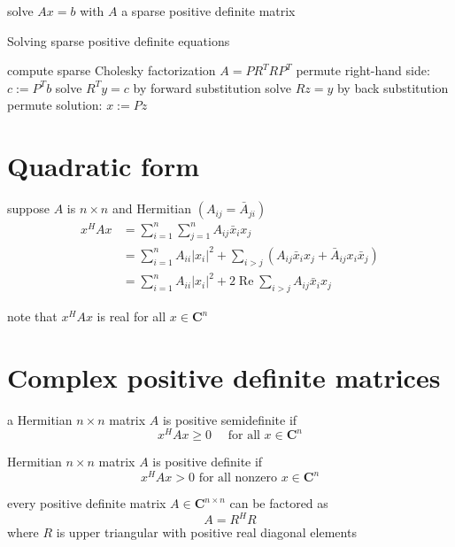 solve $ A x=b $ with $ A $ a sparse positive definite matrix

\begin{algorithm}
    \caption{Solving sparse positive definite equations}
    compute sparse Cholesky factorization $ A=P R^{T} R P^{T} $\;
    permute right-hand side: $ c:=P^{T} b $\;
    solve $ R^{T} y=c $ by forward substitution\;
    solve $ R z=y $ by back substitution\;
    permute solution: $ x:=P z $\;
\end{algorithm}

\section{Quadratic form}

\begin{theorem}
    suppose $A$ is $n \times n$ and Hermitian $\left(A_{i j}=\bar{A}_{j i}\right)$
$$
\begin{aligned}
x^{H} A x &=\sum_{i=1}^{n} \sum_{j=1}^{n} A_{i j} \bar{x}_{i} x_{j} \\
&=\sum_{i=1}^{n} A_{i i}\left|x_{i}\right|^{2}+\sum_{i>j}\left(A_{i j} \bar{x}_{i} x_{j}+\bar{A}_{i j} x_{i} \bar{x}_{j}\right) \\
&=\sum_{i=1}^{n} A_{i i}\left|x_{i}\right|^{2}+2 \operatorname{Re} \sum_{i>j} A_{i j} \bar{x}_{i} x_{j}
\end{aligned}
$$
\end{theorem}

\begin{remark}
    note that $x^{H} A x$ is real for all $x \in \mathbf{C}^{n}$
\end{remark}




\section{Complex positive definite matrices}

\begin{definition}
    a Hermitian $n \times n$ matrix $A$ is positive semidefinite if
$$
x^{H} A x \geq 0 \quad \text { for all } x \in \mathbf{C}^{n}
$$
\end{definition}

\begin{definition} Hermitian $n \times n$ matrix $A$ is positive definite if
$$
x^{H} A x>0 \text { for all nonzero } x \in \mathbf{C}^{n}
$$
\end{definition}

\begin{theorem}
    every positive definite matrix $A \in \mathbf{C}^{n \times n}$ can be factored as
$$
A=R^{H} R
$$
where $R$ is upper triangular with positive real diagonal elements
\end{theorem}


